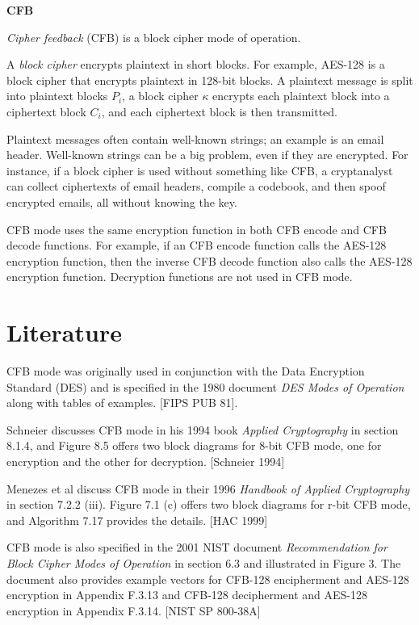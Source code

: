 \documentclass{article}
\begin{document}
\textbf{\huge{CFB}}
\vspace{8ex}

\emph{Cipher feedback} (CFB) is a block cipher mode of operation.

A \emph{block cipher} encrypts plaintext in short blocks.
For example, AES-128 is a block cipher that encrypts plaintext in 128-bit blocks.
A plaintext message is split into plaintext blocks $P_i$,
a block cipher $\kappa$ encrypts each plaintext block into a ciphertext block $C_i$,
and each ciphertext block is then transmitted.

Plaintext messages often contain well-known strings; an example is an email header.
Well-known strings can be a big problem, even if they are encrypted.
For instance, if a block cipher is used without something like CFB, 
a cryptanalyst can collect ciphertexts of email headers, compile a codebook,
and then spoof encrypted emails, all without knowing the key.

CFB mode uses the same encryption function in both CFB encode and CFB decode functions.
For example, if an CFB encode function calls the AES-128 encryption function,
then the inverse CFB decode function also calls the AES-128 encryption function.
Decryption functions are not used in CFB mode.

\section*{Literature}

CFB mode was originally used in conjunction with the Data Encryption Standard (DES) 
and is specified in the 1980 document \emph{DES Modes of Operation} along with tables of examples.
[FIPS PUB 81].

Schneier discusses CFB mode in his 1994 book \emph{Applied Cryptography} in section 8.1.4,
and Figure 8.5 offers two block diagrams for 8-bit CFB mode, one for encryption and 
the other for decryption. [Schneier 1994]

Menezes et al discuss CFB mode in their 1996 \emph{Handbook of Applied Cryptography}
in section 7.2.2 (iii).  Figure 7.1 (c) offers two block diagrams for r-bit CFB mode,
and Algorithm 7.17 provides the details. [HAC 1999]

CFB mode is also specified in the 2001 NIST document \emph{Recommendation for Block Cipher 
Modes of Operation} in section 6.3 and illustrated in Figure 3.  The document also 
provides example vectors for CFB-128 encipherment and AES-128 encryption in Appendix F.3.13
and CFB-128 decipherment and AES-128 encryption in Appendix F.3.14. [NIST SP 800-38A]
\end{document}

